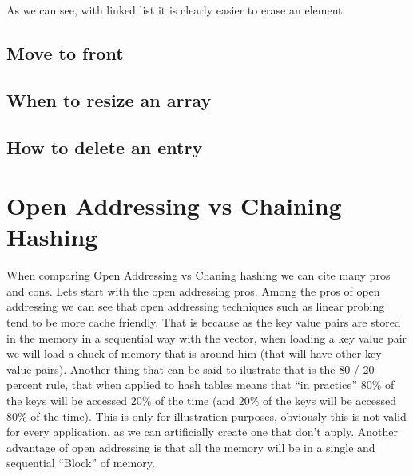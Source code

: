 As we can see, with linked list it is clearly easier to erase an element. 

\subsection{Move to front}

\subsection{When to resize an array}

\subsection{How to delete an entry}

\section{Open Addressing vs Chaining Hashing}

When comparing Open Addressing vs Chaning hashing we can cite many pros and cons. Lets start with the open addressing pros. Among the pros of open addressing we can see that open addressing techniques such as linear probing tend to be more cache friendly. That is because as the key value pairs are stored in the memory in a sequential way with the vector, when loading a key value pair we will load a chuck of memory that is around him (that will have other key value pairs). Another thing that can be said to ilustrate that is the 80 / 20 percent rule, that when applied to hash tables means that ``in practice'' 80\% of the keys will be accessed 20\% of the time (and 20\% of the keys will be accessed 80\% of the time). This is only for illustration purposes, obviously this is not valid for every application, as we can artificially create one that don't apply. Another advantage of open addressing is that all the memory will be in a single and sequential ``Block'' of memory. 